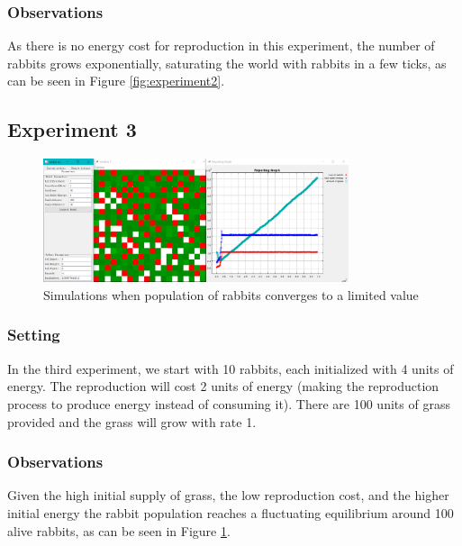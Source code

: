 \documentclass[11pt]{article}
\begin{document}
\subsubsection{Observations}
As there is no energy cost for reproduction in this experiment, the number of rabbits grows exponentially, saturating the world with rabbits in a few ticks, as can be seen in Figure \ref{fig:experiment2}.

\subsection{Experiment 3}

\begin{figure}[H]
 \begin{center}
  \includegraphics[width=0.8\textwidth]{plots/balance1.PNG}
  \caption{Simulations when population of rabbits converges to a limited value}
  \label{fig:experiment3}
 \end{center}
\end{figure}

\subsubsection{Setting}
In the third experiment, we start with 10 rabbits, each initialized with 4 units of energy. The reproduction will cost 2 units of energy (making the reproduction process to produce energy instead of consuming it). There are 100 units of grass provided and the grass will grow with rate 1.

\subsubsection{Observations}
Given the high initial supply of grass, the low reproduction cost, and the higher initial energy the rabbit population reaches a fluctuating equilibrium around 100 alive rabbits, as can be seen in Figure \ref{fig:experiment3}.
\end{document}
